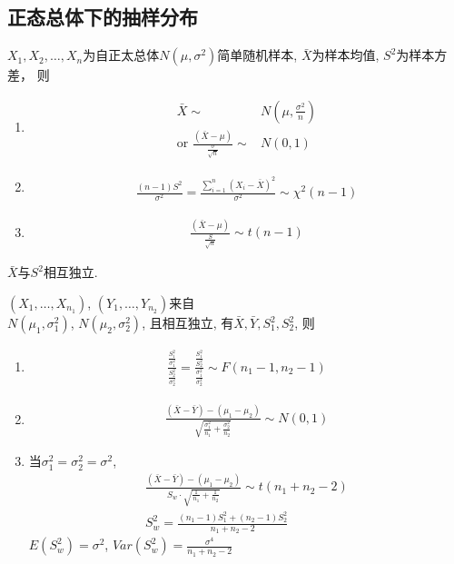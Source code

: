 \subsection{正态总体下的抽样分布}
\begin{theorem}
    $X_1,X_2,\dots,X_n$为自正太总体$N(\mu,\sigma^2)$简单随机样本, $\bar{X}$为样本均值, $S^2$为样本方差， 则
    \begin{enumerate}
        \item \begin{align*}
            \bar{X}\sim& N(\mu,\frac{\sigma^2}{n})\\
            \text{or }\frac{(\bar{X}-\mu)}{\frac{\sigma}{\sqrt{n}}}\sim& N(0,1)
        \end{align*}
        \item \begin{align*}
            \frac{(n-1)S^2}{\sigma^2}=\frac{\sum_{i=1}^n(X_i-\bar{X})^2}{\sigma^2}\sim \chi ^2(n-1)
        \end{align*}
        \item \begin{align*}
            \frac{(\bar{X}-\mu)}{\frac{S}{\sqrt{n}}}\sim t(n-1)
        \end{align*}
    \end{enumerate}
    $\bar{X}$与$S^2$相互独立. 
\end{theorem}

\begin{theorem}
    $(X_1,\dots,X_{n_1})$, $(Y_1,\dots,Y_{n_2})$来自\\$N(\mu_1,\sigma_1^2)$, $N(\mu_2,\sigma_2^2)$, 且相互独立, 有$\bar{X},\bar{Y}, S_1^2, S_2^2$, 则
    \begin{enumerate}
        \item \begin{align*}
            \frac{\frac{S_1^2}{\sigma_1^2}}{\frac{S_2^2}{\sigma_2^2}}=\frac{\frac{S_1^2}{S_2^2}}{\frac{\sigma_1^2}{\sigma_2^2}}\sim F(n_1-1,n_2-1)
        \end{align*}
        \item \begin{align*}
            \frac{(\bar{X}-\bar{Y})-(\mu_1-\mu_2)}{\sqrt{\frac{\sigma_1^2}{n_1}+\frac{\sigma_2^2}{n_2}}}\sim N(0,1)
        \end{align*}
        \item 当$\sigma_1^2=\sigma_2^2=\sigma^2$, 
        \begin{align*}
            \frac{(\bar{X}-\bar{Y})-(\mu_1-\mu_2)}{S_w\cdot\sqrt{\frac{1}{n_1}+\frac{1}{n_2}}}\sim t(n_1+n_2-2)\\
            S_w^2=\frac{(n_1-1)S_1^2+(n_2-1)S_2^2}{n_1+n_2-2}
        \end{align*}
        $E(S_w^2)=\sigma^2$, $Var(S_w^2)=\frac{\sigma^4}{n_1+n_2-2}$
    \end{enumerate}
\end{theorem}